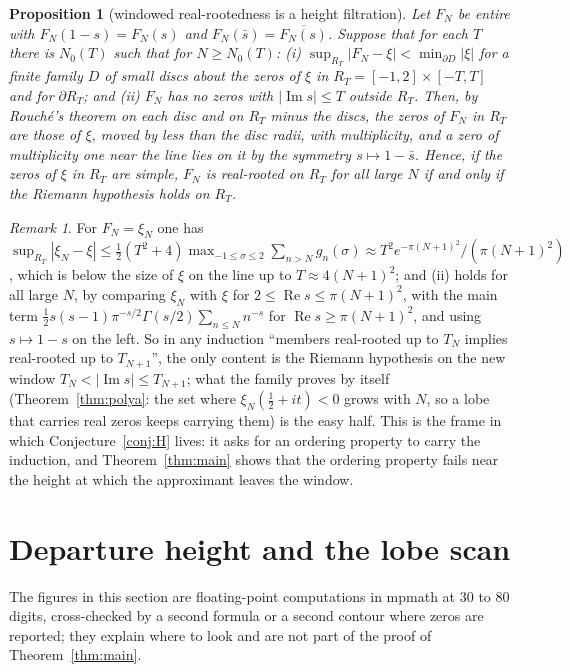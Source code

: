 \documentclass[11pt]{article}
\theoremstyle{plain}
\newtheorem{proposition}[theorem]{Proposition}
\theoremstyle{definition}
\theoremstyle{remark}
\newtheorem{remark}[theorem]{Remark}
\newcommand{\re}{\operatorname{Re}}
\newcommand{\im}{\operatorname{Im}}
\begin{document}
\begin{proposition}[windowed real-rootedness is a height filtration]\label{prop:F}
Let $F_N$ be entire with $F_N(1-s) = F_N(s)$ and $F_N(\bar s) =
\overline{F_N(s)}$. Suppose that for each $T$ there is $N_0(T)$ such that for
$N \ge N_0(T)$: \textup{(i)} $\sup_{R_T}|F_N - \xi| < \min_{\partial D}|\xi|$
for a finite family $D$ of small discs about the zeros of $\xi$ in
$R_T = [-1, 2] \times [-T, T]$ and for $\partial R_T$; and \textup{(ii)} $F_N$ has
no zeros with $|\im s| \le T$ outside $R_T$. Then, by Rouch\'e's theorem on each
disc and on $R_T$ minus the discs, the zeros of $F_N$ in $R_T$ are those of $\xi$,
moved by less than the disc radii, with multiplicity, and a zero of multiplicity
one near the line lies on it by the symmetry $s \mapsto 1 - \bar s$. Hence, if the
zeros of $\xi$ in $R_T$ are simple, $F_N$ is real-rooted on $R_T$ for all large
$N$ if and only if the Riemann hypothesis holds on $R_T$.
\end{proposition}

\begin{remark}
For $F_N = \xi_N$ one has
$\sup_{R_T}|\xi_N - \xi| \le \tfrac12(T^2 + 4)\max_{-1 \le \sigma \le 2}
\sum_{n > N}g_n(\sigma) \approx T^2 e^{-\pi(N+1)^2}/(\pi(N+1)^2)$, which is below
the size of $\xi$ on the line up to $T \approx 4(N+1)^2$; and (ii) holds for all
large $N$, by comparing $\xi_N$ with $\xi$ for $2 \le \re s \le \pi(N+1)^2$, with
the main term $\tfrac12 s(s-1)\pi^{-s/2}\Gamma(s/2)\sum_{n \le N}n^{-s}$ for
$\re s \ge \pi(N+1)^2$, and using $s \mapsto 1 - s$ on the left. So in any
induction ``members real-rooted up to $T_N$ implies real-rooted up to
$T_{N+1}$'', the only content is the Riemann hypothesis on the new window
$T_N < |\im s| \le T_{N+1}$; what the family proves by itself
(Theorem~\ref{thm:polya}: the set where $\xi_N(\tfrac12+it) < 0$ grows with $N$,
so a lobe that carries real zeros keeps carrying them) is the easy
half. This is the frame in which Conjecture~\ref{conj:H} lives: it asks for an
ordering property to carry the induction, and Theorem~\ref{thm:main} shows that
the ordering property fails near the height at which the approximant leaves the
window.
\end{remark}

\section{Departure height and the lobe scan}
\label{sec:departure}

The figures in this section are floating-point computations in mpmath at $30$
to $80$ digits, cross-checked by a second formula or a second contour where
zeros are reported; they explain where to look and are not part of the proof of
Theorem~\ref{thm:main}.
\end{document}
